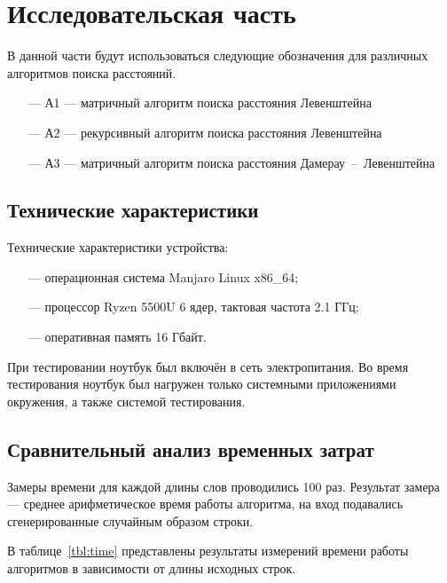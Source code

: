 \chapter{Исследовательская часть}

В данной части будут использоваться следующие обозначения для различных алгоритмов поиска расстояний.

\begin{itemize}
 	\item[---]А1 --- матричный алгоритм поиска расстояния Левенштейна
 	\item[---]А2 --- рекурсивный алгоритм поиска расстояния Левенштейна
 	\item[---]А3 --- матричный алгоритм поиска расстояния Дамерау~--~Левенштейна
\end{itemize}


\section{Технические характеристики}

Технические характеристики устройства:

\begin{itemize}
	\item[---] операционная система Manjaro Linux x86\_64;
	\item[---] процессор Ryzen 5500U 6 ядер, тактовая частота 2.1 ГГц;
	\item[---] оперативная память 16 Гбайт.
\end{itemize}

При тестировании ноутбук был включён в сеть электропитания. Во время тестирования ноутбук был нагружен только системными приложениями окружения, а также системой тестирования.


\section{Сравнительный анализ временных затрат}

Замеры времени для каждой длины слов проводились 100 раз. Результат замера --- среднее арифметическое время работы алгоритма, на вход подавались сгенерированные случайным образом строки.

В таблице~\ref{tbl:time} представлены результаты измерений времени работы алгоритмов в зависимости от длины исходных строк. 

\clearpage

